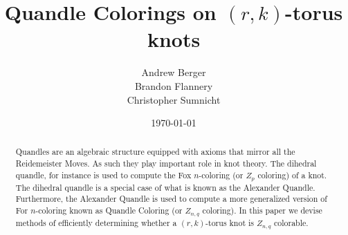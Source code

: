 \documentclass[11pt]{article}
\title{Quandle Colorings on $(r,k)$-torus knots}
\author{
        Andrew Berger \\
	Brandon Flannery \\
	Christopher Sumnicht \\
}
\date{\today}
\theoremstyle{plain}
\theoremstyle{definition}
\begin{document}
\maketitle
\begin{abstract}
	Quandles are an algebraic structure equipped with axioms that mirror all the Reidemeister Moves. As such they play important role in knot theory. The dihedral quandle, for instance is used to compute the Fox $n$-coloring (or $Z_p$ coloring) of a knot. The dihedral quandle is a special case of what is known as the Alexander Quandle. Furthermore, the Alexander Quandle is used to compute a more generalized version of For $n$-coloring known as Quandle Coloring (or $Z_{n,q}$ coloring). In this paper we devise methods of efficiently determining whether a $(r,k)$-torus knot is $Z_{n,q}$ colorable.
\end{abstract}

\clearpage
\tableofcontents
\clearpage










\end{document}
